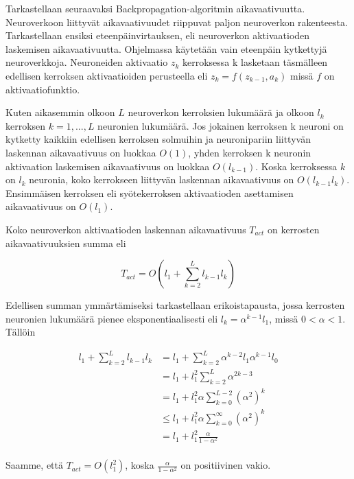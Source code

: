 \documentclass[11pt]{article}
\begin{document}
Tarkastellaan seuraavaksi Backpropagation-algoritmin aikavaativuutta. Neuroverkoon liittyvät aikavaativuudet riippuvat paljon neuroverkon rakenteesta. Tarkastellaan ensiksi eteenpäinvirtauksen, eli neuroverkon aktivaatioden laskemisen aikavaativuutta. Ohjelmassa käytetään vain eteenpäin kytkettyjä neuroverkkoja. Neuroneiden aktivaatio $z_k$ kerroksessa k lasketaan täsmälleen edellisen kerroksen aktivaatioiden perusteella eli $z_k = f(z_{k - 1}, a_k)$ missä $f$ on aktivaatiofunktio.

 Kuten aikasemmin olkoon $L$ neuroverkon kerroksien lukumäärä ja olkoon $l_k$ kerroksen $k = 1, ..., L$ neuronien lukumäärä. Jos jokainen kerroksen k neuroni on kytketty kaikkiin edellisen kerroksen solmuihin ja neuronipariin liittyvän laskennan aikavaativuus on luokkaa $O(1)$, yhden kerroksen k neuronin aktivaation laskemisen aikavaativuus on luokkaa $O(l_{k - 1})$. Koska kerroksessa $k$ on $l_k$ neuronia, koko kerrokseen liittyvän laskennan aikavaativuus on $O(l_{k - 1} l_k)$. Ensimmäisen kerroksen eli syötekerroksen aktivaatioden asettamisen aikavaativuus on $O(l_1)$.

Koko neuroverkon aktivaatioden laskennan aikavaativuus $T_{act}$ on kerrosten aikavaativuuksien summa eli

\begin{equation*}
T_{act} = O(l_1  + \sum_{k = 2}^{L}l_{k-1} l_k)
\end{equation*}

Edellisen summan ymmärtämiseksi tarkastellaan erikoistapausta, jossa kerrosten neuronien lukumäärä pienee eksponentiaalisesti eli $l_k = \alpha ^ {k - 1} l_1$, missä $0 < \alpha < 1$.
Tällöin 

\begin{equation*}
\begin{aligned} 
l_1  + \sum_{k = 2}^{L}l_{k-1} l_k &= l_1  + \sum_{k = 2}^{L}\alpha^{k-2} l_1 \alpha^{k - 1} l_0 \\
&= l_1 + l_1^2\sum_{k = 2}^{L}\alpha^{2k-3} \\
&= l_1 + l_1^2\alpha\sum_{k = 0}^{L - 2}(\alpha^2)^{k} \\
&\leq l_1 + l_1^2\alpha\sum_{k = 0}^{\infty}(\alpha^2)^{k} \\
&= l_1 + l_1^2\frac{\alpha}{1 - \alpha^2} \\
\end{aligned}
\end{equation*}

Saamme, että $T_{act} = O(l_1^2)$, koska $\frac{\alpha}{1 - \alpha^2}$ on positiivinen vakio.
\end{document}
